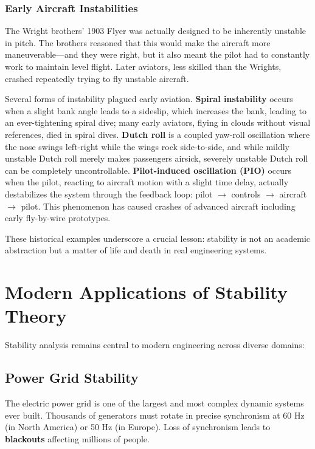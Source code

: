 \subsubsection{Early Aircraft Instabilities}

The Wright brothers' 1903 Flyer was actually designed to be inherently unstable in pitch. The brothers reasoned that this would make the aircraft more maneuverable---and they were right, but it also meant the pilot had to constantly work to maintain level flight. Later aviators, less skilled than the Wrights, crashed repeatedly trying to fly unstable aircraft.

Several forms of instability plagued early aviation. \textbf{Spiral instability} occurs when a slight bank angle leads to a sideslip, which increases the bank, leading to an ever-tightening spiral dive; many early aviators, flying in clouds without visual references, died in spiral dives. \textbf{Dutch roll} is a coupled yaw-roll oscillation where the nose swings left-right while the wings rock side-to-side, and while mildly unstable Dutch roll merely makes passengers airsick, severely unstable Dutch roll can be completely uncontrollable. \textbf{Pilot-induced oscillation (PIO)} occurs when the pilot, reacting to aircraft motion with a slight time delay, actually destabilizes the system through the feedback loop: pilot $\to$ controls $\to$ aircraft $\to$ pilot. This phenomenon has caused crashes of advanced aircraft including early fly-by-wire prototypes.

These historical examples underscore a crucial lesson: stability is not an academic abstraction but a matter of life and death in real engineering systems.

\section{Modern Applications of Stability Theory}
\label{sec:modern_applications}

Stability analysis remains central to modern engineering across diverse domains:

\subsection{Power Grid Stability}

The electric power grid is one of the largest and most complex dynamic systems ever built. Thousands of generators must rotate in precise synchronism at 60 Hz (in North America) or 50 Hz (in Europe). Loss of synchronism leads to \textbf{blackouts} affecting millions of people.

